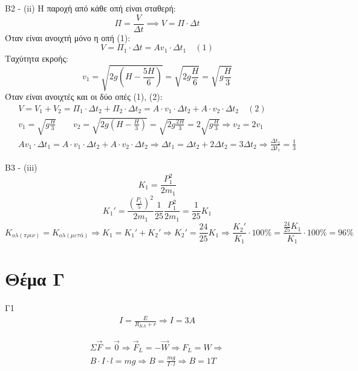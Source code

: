 \documentclass[greek]{beamer}
\begin{document}
\begin{frame}{Β2 - (ii)}
 \begingroup
 \tiny%
 Η παροχή από κάθε οπή είναι σταθερή: $$Π=\frac{V}{Δt}\implies V=Π\cdot Δt$$
 Όταν είναι ανοιχτή μόνο η οπή (1): $$V=Π_1\cdot Δt=Αv_1\cdot Δt_1 \quad (1)$$
 Ταχύτητα εκροής: $$v_1=\sqrt{2g\left(H-\frac{5H}{6}\right)}=\sqrt{2g\frac{H}{6}}=\sqrt{g\frac{H}{3}}$$
 Όταν είναι ανοιχτές και οι δύο οπές (1), (2):
 \begin{gather*}
  V=V_1+V_2=Π_1\cdot Δt_2+Π_2\cdot Δt_2=Α\cdot v_1\cdot Δt_2+Α\cdot v_2\cdot Δt_2 \quad (2) \\
  v_1=\sqrt{g\frac{H}{3}} \qquad v_2=\sqrt{2g\left(H-\frac{H}{3}\right)}=\sqrt{2g\frac{2H}{3}}=2\sqrt{g\frac{H}{3}} \Rightarrow v_2=2v_1 \\
  Αv_1\cdot Δt_1 = Α\cdot v_1\cdot Δt_2+Α\cdot v_2\cdot Δt_2 \Rightarrow Δt_1=Δt_2+2Δt_2=3Δt_2\Rightarrow \frac{Δt_2}{Δt_1}=\frac{1}{3}
 \end{gather*}
 \endgroup
\end{frame}

\begin{frame}{Β3 - (iii)}
 \begingroup
 \tiny%
 $$K_1=\frac{P_1^2}{2m_1}$$
 $$K_1'=\frac{\left(\frac{P_1}{5}\right)^2}{2m_1}\frac{1}{25}\frac{P_1^2}{2m_1}=\frac{1}{25}K_1$$
 $$K_{ολ(πριν)}=K_{ολ(μετά)}\Rightarrow K_1=K_1'+K_2'\Rightarrow K_2'=\frac{24}{25}K_1 \Rightarrow \frac{K_2'}{K_1}\cdot 100\%=\frac{\frac{24}{25}K_1}{K_1}\cdot 100\%=96\%$$
 \endgroup
\end{frame}

\section{Θέμα Γ}
\begin{frame}{Γ1}
 \begin{gather*}
  I=\frac{E}{R_{ΚΛ}+r}\Rightarrow I=3A
 \end{gather*}

 \begin{gather*}
  Σ\overrightarrow{F}=\overrightarrow{0}\Rightarrow \overrightarrow{F}_L=-\overrightarrow{W}\Rightarrow F_L=W\Rightarrow \\
  B\cdot I\cdot l = mg\Rightarrow B=\frac{mg}{I\cdot l}\Rightarrow B=1T
 \end{gather*}
\end{frame}
\end{document}
